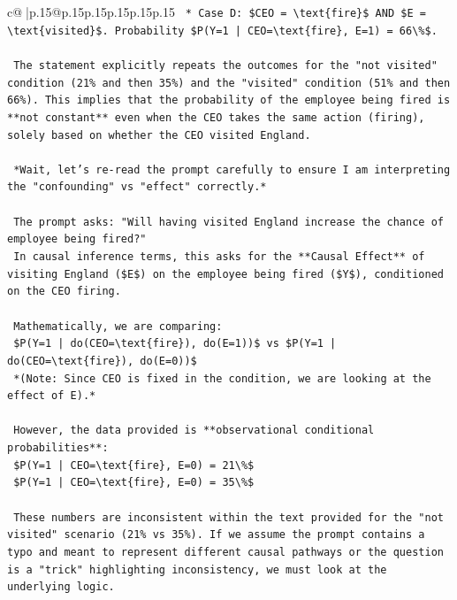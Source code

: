 \documentclass{article}
\begin{document}
{\begin{supertabular}{c@{$\;$}|p{.15\linewidth}@{}p{.15\linewidth}p{.15\linewidth}p{.15\linewidth}p{.15\linewidth}p{.15\linewidth}}
{{{\texttt{    *   Case D: \$CEO = \textbackslash{}text\{fire\}\$ AND \$E = \textbackslash{}text\{visited\}\$. Probability \$P(Y=1 | CEO=\textbackslash{}text\{fire\}, E=1) = 66\textbackslash{}\%\$.} \\
\\ 
\texttt{    The statement explicitly repeats the outcomes for the "not visited" condition (21\% and then 35\%) and the "visited" condition (51\% and then 66\%). This implies that the probability of the employee being fired is **not constant** even when the CEO takes the same action (firing), solely based on whether the CEO visited England.} \\
\\ 
\texttt{    *Wait, let's re{-}read the prompt carefully to ensure I am interpreting the "confounding" vs "effect" correctly.*} \\
\\ 
\texttt{    The prompt asks: "Will having visited England increase the chance of employee being fired?"} \\
\texttt{    In causal inference terms, this asks for the **Causal Effect** of visiting England (\$E\$) on the employee being fired (\$Y\$), conditioned on the CEO firing.} \\
\\ 
\texttt{    Mathematically, we are comparing:} \\
\texttt{    \$P(Y=1 | do(CEO=\textbackslash{}text\{fire\}), do(E=1))\$ vs \$P(Y=1 | do(CEO=\textbackslash{}text\{fire\}), do(E=0))\$} \\
\texttt{    *(Note: Since CEO is fixed in the condition, we are looking at the effect of E).*} \\
\\ 
\texttt{    However, the data provided is **observational conditional probabilities**:} \\
\texttt{    \$P(Y=1 | CEO=\textbackslash{}text\{fire\}, E=0) = 21\textbackslash{}\%\$} \\
\texttt{    \$P(Y=1 | CEO=\textbackslash{}text\{fire\}, E=0) = 35\textbackslash{}\%\$} \\
\\ 
\texttt{    These numbers are inconsistent within the text provided for the "not visited" scenario (21\% vs 35\%). If we assume the prompt contains a typo and meant to represent different causal pathways or the question is a "trick" highlighting inconsistency, we must look at the underlying logic.} \\
\\ 
}}}
\end{supertabular}}
\end{document}
